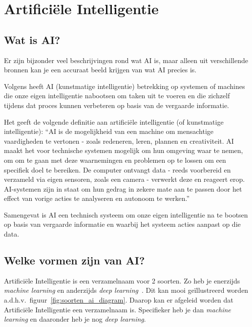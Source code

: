 \clearpage

\section{Artificiële Intelligentie}
\subsection{Wat is AI?}
Er zijn bijzonder veel beschrijvingen rond wat AI is, maar alleen uit verschillende bronnen kan je een accuraat beeld krijgen van wat AI precies is.

Volgens \textcite{Oracle2014} heeft AI (kunstmatige intelligentie) betrekking op systemen of machines die onze eigen intelligentie nabootsen om taken uit te voeren en die zichzelf tijdens dat proces kunnen verbeteren op basis van de vergaarde informatie.

Het \textcite{EuropeesParlement2020} geeft de volgende definitie aan artificiële intelligentie (of kunstmatige intelligentie): ``AI is de mogelijkheid van een machine om mensachtige vaardigheden te vertonen - zoals redeneren, leren, plannen en creativiteit.
AI maakt het voor technische systemen mogelijk om hun omgeving waar te nemen, om om te gaan met deze waarnemingen en problemen op te lossen om een specifiek doel te bereiken. De computer ontvangt data - reeds voorbereid en verzameld via eigen sensoren, zoals een camera - verwerkt deze en reageert erop.
AI-systemen zijn in staat om hun gedrag in zekere mate aan te passen door het effect van vorige acties te analyseren en autonoom te werken.''

Samengevat is AI een technisch systeem om onze eigen intelligentie na te bootsen op basis van vergaarde informatie en waarbij het systeem acties aanpast op die data.

\subsection{Welke vormen zijn van AI?}
Artificiële Intelligentie is een verzamelnaam voor 2 soorten. Zo heb je enerzijds \textit{machine learning} en anderzijds \textit{deep learning}~\autocite{Kavlakoglu2020}.
Dit kan mooi geïllustreerd worden a.d.h.v.\ figuur~\ref{fig:soorten_ai_diagram}. Daarop kan er afgeleid worden dat Artificiële Intelligentie een verzamelnaam is. Specifieker heb je dan \textit{machine learning} en daaronder heb je nog \textit{deep learning}.

